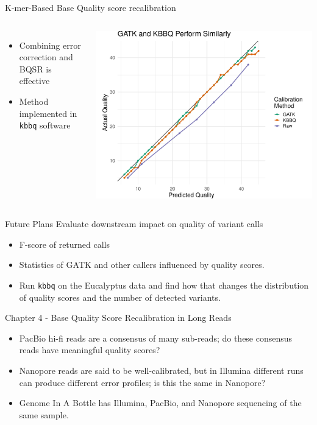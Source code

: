 \documentclass{beamer}
\begin{document}
\begin{frame}{K-mer-Based Base Quality score recalibration}
\begin{columns}
\begin{itemize}
\item Combining error correction and BQSR is effective
\item Method implemented in \texttt{kbbq} software
\end{itemize}
\includegraphics[width=.95\linewidth]{comparison.pdf}
\end{columns}
\end{frame}

\begin{frame}{Future Plans}
Evaluate downstream impact on quality of variant calls
\begin{itemize}
\item F-score of returned calls
\item Statistics of GATK and other callers influenced by quality scores.
\item Run \texttt{kbbq} on the Eucalyptus data and find how that changes the distribution of quality scores and the number of detected variants.
\end{itemize}
\end{frame}

\begin{frame}{Chapter 4 - Base Quality Score Recalibration in Long Reads}
\begin{itemize}
\item PacBio hi-fi reads are a consensus of many sub-reads; do these consensus reads have meaningful quality scores?
\item Nanopore reads are said to be well-calibrated, but in Illumina different runs can produce different error profiles; is this the same in Nanopore?
\item Genome In A Bottle has Illumina, PacBio, and Nanopore sequencing of the same sample.
\end{itemize}
\end{frame}
\end{document}
